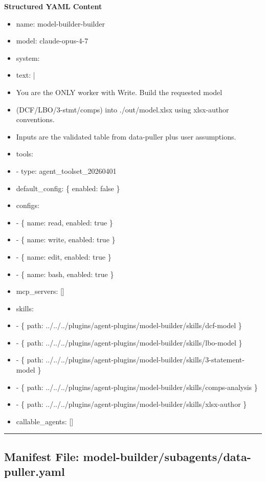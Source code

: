 \documentclass[11pt]{article}
\begin{document}
\textbf{Structured YAML Content}
\begin{itemize}[leftmargin=*,itemsep=2pt,topsep=2pt]
\item {} name: model-builder-builder
\item {} model: claude-opus-4-7
\item {} system:
\item {} text: |
\item {} You are the ONLY worker with Write. Build the requested model
\item {} (DCF/LBO/3-stmt/comps) into ./out/model.xlsx using xlsx-author conventions.
\item {} Inputs are the validated table from data-puller plus user assumptions.
\item {} tools:
\item {} - type: agent\_\allowbreak{}toolset\_\allowbreak{}20260401
\item {} default\_\allowbreak{}config: \{ enabled: false \}
\item {} configs:
\item {} - \{ name: read, enabled: true \}
\item {} - \{ name: write, enabled: true \}
\item {} - \{ name: edit, enabled: true \}
\item {} - \{ name: bash, enabled: true \}
\item {} mcp\_\allowbreak{}servers: []
\item {} skills:
\item {} - \{ path: ../../../plugins/agent-plugins/model-builder/skills/dcf-model \}
\item {} - \{ path: ../../../plugins/agent-plugins/model-builder/skills/lbo-model \}
\item {} - \{ path: ../../../plugins/agent-plugins/model-builder/skills/3-statement-model \}
\item {} - \{ path: ../../../plugins/agent-plugins/model-builder/skills/comps-analysis \}
\item {} - \{ path: ../../../plugins/agent-plugins/model-builder/skills/xlsx-author \}
\item {} callable\_\allowbreak{}agents: []
\end{itemize}

\vspace{0.8em}\hrule\vspace{0.8em}

\subsection{Manifest File: model-builder/subagents/data-puller.yaml}\label{file:model-builder-subagents-data-puller-yaml}
\end{document}
